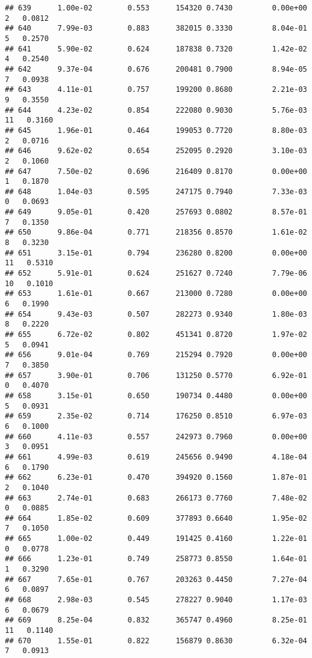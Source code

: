 \documentclass[
]{article}
\begin{document}
\begin{verbatim}
## 639      1.00e-02        0.553      154320 0.7430         0.00e+00   2   0.0812
## 640      7.99e-03        0.883      382015 0.3330         8.04e-01   5   0.2570
## 641      5.90e-02        0.624      187838 0.7320         1.42e-02   4   0.2540
## 642      9.37e-04        0.676      200481 0.7900         8.94e-05   7   0.0938
## 643      4.11e-01        0.757      199200 0.8680         2.21e-03   9   0.3550
## 644      4.23e-02        0.854      222080 0.9030         5.76e-03  11   0.3160
## 645      1.96e-01        0.464      199053 0.7720         8.80e-03   2   0.0716
## 646      9.62e-02        0.654      252095 0.2920         3.10e-03   2   0.1060
## 647      7.50e-02        0.696      216409 0.8170         0.00e+00   1   0.1870
## 648      1.04e-03        0.595      247175 0.7940         7.33e-03   0   0.0693
## 649      9.05e-01        0.420      257693 0.0802         8.57e-01   7   0.1350
## 650      9.86e-04        0.771      218356 0.8570         1.61e-02   8   0.3230
## 651      3.15e-01        0.794      236280 0.8200         0.00e+00  11   0.5310
## 652      5.91e-01        0.624      251627 0.7240         7.79e-06  10   0.1010
## 653      1.61e-01        0.667      213000 0.7280         0.00e+00   6   0.1990
## 654      9.43e-03        0.507      282273 0.9340         1.80e-03   8   0.2220
## 655      6.72e-02        0.802      451341 0.8720         1.97e-02   5   0.0941
## 656      9.01e-04        0.769      215294 0.7920         0.00e+00   7   0.3850
## 657      3.90e-01        0.706      131250 0.5770         6.92e-01   0   0.4070
## 658      3.15e-01        0.650      190734 0.4480         0.00e+00   5   0.0931
## 659      2.35e-02        0.714      176250 0.8510         6.97e-03   6   0.1000
## 660      4.11e-03        0.557      242973 0.7960         0.00e+00   3   0.0951
## 661      4.99e-03        0.619      245656 0.9490         4.18e-04   6   0.1790
## 662      6.23e-01        0.470      394920 0.1560         1.87e-01   2   0.1040
## 663      2.74e-01        0.683      266173 0.7760         7.48e-02   0   0.0885
## 664      1.85e-02        0.609      377893 0.6640         1.95e-02   7   0.1050
## 665      1.00e-02        0.449      191425 0.4160         1.22e-01   0   0.0778
## 666      1.23e-01        0.749      258773 0.8550         1.64e-01   1   0.3290
## 667      7.65e-01        0.767      203263 0.4450         7.27e-04   6   0.0897
## 668      2.98e-03        0.545      278227 0.9040         1.17e-03   6   0.0679
## 669      8.25e-04        0.832      365747 0.4960         8.25e-01  11   0.1140
## 670      1.55e-01        0.822      156879 0.8630         6.32e-04   7   0.0913

\end{verbatim}
\end{document}
